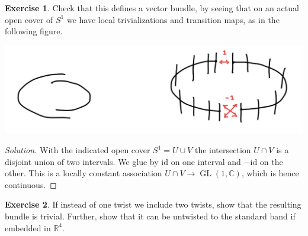 \documentclass{article}
\theoremstyle{definition}
\newtheorem*{exercise}{Exercise}
\DeclareMathOperator{\GL}{GL}
\newcommand{\id}{\mathrm{id}}
\newcommand{\R}{\mathbb{R}}
\newcommand{\C}{\mathbb{C}}
\begin{document}
\begin{exercise}
    Check that this defines a vector bundle, by seeing that on an actual open
    cover of $S^1$ we have local trivializations and transition maps, as in the
    following figure.
    \begin{center}
        \includegraphics[scale=0.3]{chern_mobius2}
    \end{center}
\end{exercise}

\begin{proof}[Solution]
    With the indicated open cover $S^1=U\cup V$ the intersection $U\cap V$ is a
    disjoint union of two intervals. We glue by $\id$ on one interval and $-\id$
    on the other. This is a locally constant association $U\cap V\to\GL(1,\C)$,
    which is hence continuous.
\end{proof}

\begin{exercise}
    If instead of one twist we include two twists, show that the resulting
    bundle is trivial. Further, show that it can be untwisted to the standard
    band if embedded in $\R^4$.
\end{exercise}
\end{document}
